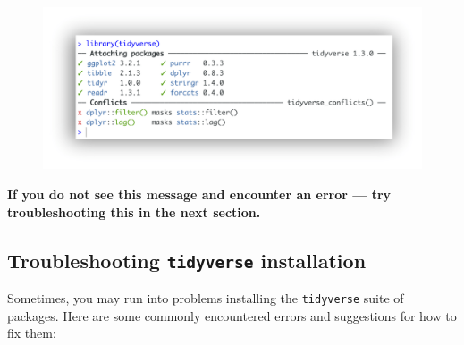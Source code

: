 \documentclass[]{book}
\begin{document}
\begin{enumerate}
  \begin{figure}
  \centering
  \includegraphics{R/Rinstall/images/tidyverse_install.png}
  \caption{}
  \end{figure}

  \textbf{If you do not see this message and encounter an error --- try
  troubleshooting this in the next section.}
\end{enumerate}

\subsection{\texorpdfstring{Troubleshooting \texttt{tidyverse}
installation}{Troubleshooting tidyverse installation}}\label{troubleshooting-tidyverse-installation}

Sometimes, you may run into problems installing the \texttt{tidyverse}
suite of packages. Here are some commonly encountered errors and
suggestions for how to fix them:
\end{document}
